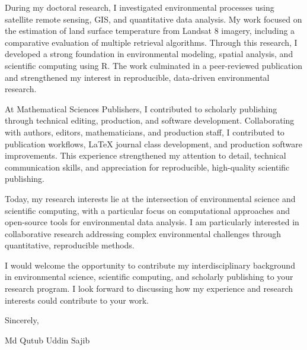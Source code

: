 \documentclass[11pt]{article}
\def\myname{Md Qutub Uddin Sajib}
\begin{document}

During my doctoral research, I investigated environmental processes
using satellite remote sensing, GIS,
and quantitative data analysis. My work focused on the estimation of
land surface temperature from Landsat 8 imagery, including a
comparative evaluation of multiple retrieval algorithms. Through this
research, I developed a strong foundation in environmental modeling,
spatial analysis, and scientific computing using R. The work
culminated in a peer-reviewed publication and strengthened my interest
in reproducible, data-driven environmental research.


At Mathematical Sciences Publishers, I contributed to scholarly publishing
through technical editing, production, and software development.
Collaborating with
authors, editors, mathematicians, and production staff, I contributed
to publication workflows, \LaTeX{} journal class development, and
production software improvements. This experience strengthened my
attention to detail, technical communication skills, and appreciation
for reproducible, high-quality scientific publishing.


Today, my research interests lie at the intersection of environmental
science and scientific computing, with a particular focus on
computational approaches and open-source tools for environmental data
analysis. I am particularly interested in collaborative research
addressing complex environmental challenges through quantitative,
reproducible methods.


I would welcome the opportunity to contribute my interdisciplinary
background in environmental science, scientific computing, and
scholarly publishing to your research program. I look forward to
discussing how my experience and research interests could contribute
to your work.

\medskip
Sincerely,

\myname
\end{document}

